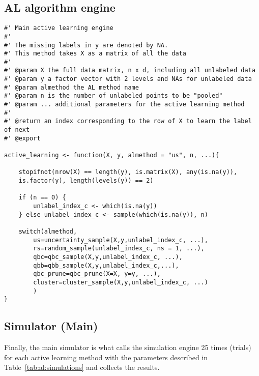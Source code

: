 \subsection{AL algorithm engine}
\label{sec:appendicies:al:simulations:alengine}
{
\begin{lstlisting}
#' Main active learning engine
#'
#' The missing labels in y are denoted by NA.
#' This method takes X as a matrix of all the data
#'
#' @param X the full data matrix, n x d, including all unlabeled data
#' @param y a factor vector with 2 levels and NAs for unlabeled data
#' @param almethod the AL method name
#' @param n is the number of unlabeled points to be "pooled"
#' @param ... additional parameters for the active learning method
#'
#' @return an index corresponding to the row of X to learn the label of next
#' @export

active_learning <- function(X, y, almethod = "us", n, ...){

	stopifnot(nrow(X) == length(y), is.matrix(X), any(is.na(y)),
	is.factor(y), length(levels(y)) == 2)
	
	if (n == 0) {
		unlabel_index_c <- which(is.na(y))
	} else unlabel_index_c <- sample(which(is.na(y)), n)
	
	switch(almethod,
		us=uncertainty_sample(X,y,unlabel_index_c, ...),
		rs=random_sample(unlabel_index_c, ns = 1, ...),
		qbc=qbc_sample(X,y,unlabel_index_c, ...),
		qbb=qbb_sample(X,y,unlabel_index_c,...),
		qbc_prune=qbc_prune(X=X, y=y, ...),
		cluster=cluster_sample(X,y,unlabel_index_c, ...)
		)
}
\end{lstlisting}
}

\subsection{Simulator (Main)}
\label{sec:appendicies:al:simulations:results}

Finally, the main simulator is what calls the simulation engine 25 times 
(trials) for each active learning method with the parameters described in 
Table~\ref{tab:al:simulations} and collects the results.

